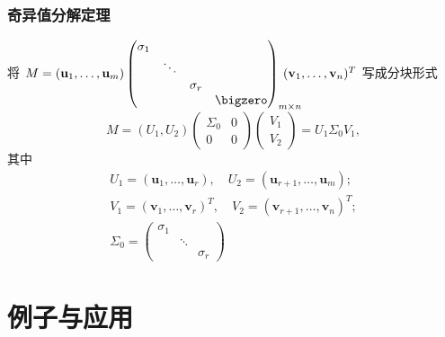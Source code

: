 
\begin{frame}
\frametitle{奇异值分解定理}

\begin{remark}[奇异值分解的一种更紧凑的形式]
将 $M = (\mathbf{u}_1,\ldots,\mathbf{u}_m) \begin{pmatrix}
\sigma_1 & & & \\ & \ddots & & \\ & & \sigma_r & \\ & & & \bigzero \end{pmatrix}_{m\times n}\!\!\!\!\!\!\!\!\!\!(\mathbf{v}_1,\ldots,\mathbf{v}_n)^T$ 写成分块形式
\[M = (U_1, U_2) \begin{pmatrix} \Sigma_0 & 0 \\ 0 & 0 \end{pmatrix} \begin{pmatrix} V_1 \\ V_2 \end{pmatrix} = U_1\Sigma_0V_1,\]
其中
\begin{gather*}
U_1 = (\mathbf{u}_1,\ldots,\mathbf{u}_r), \quad U_2 = (\mathbf{u}_{r+1},\ldots,\mathbf{u}_m); \\
V_1 = (\mathbf{v}_1,\ldots,\mathbf{v}_r)^T, \quad V_2 = (\mathbf{v}_{r+1},\ldots,\mathbf{v}_n)^T; \\
\Sigma_0 = \begin{pmatrix}
\sigma_1 & & \\ & \ddots & \\ & & \sigma_r \end{pmatrix}
\end{gather*}
\end{remark}

\end{frame}


\section{例子与应用}


